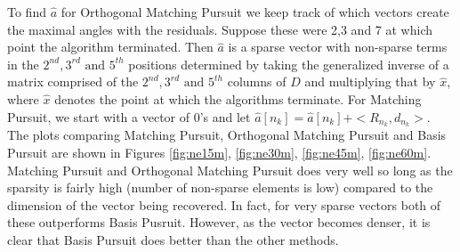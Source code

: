 \documentclass[12pt, leqno]{article}
\begin{document}
To find $\hat{a}$ for Orthogonal Matching Pursuit we keep track of
which vectors create the maximal angles with the residuals. Suppose
these were 2,3 and 7 at which point the algorithm terminated. Then
$\hat{a}$ is a sparse vector with non-sparse terms in the $2^{nd},
3^{rd} \text{ and } 5^{th}$ positions determined by taking the
generalized inverse of a matrix comprised of the  $2^{nd}, 3^{rd}
\text{ and } 5^{th}$ columns of $D$ and multiplying that by $\hat{x}$,
where $\hat{x}$ denotes the point at which the algorithms
terminate. For Matching Pursuit, we start with a vector of 0's and let
$\hat{a}[n_k] = \hat{a}[n_k]+<R_{n_k},d_{n_k}>$. The plots comparing Matching Pursuit, Orthogonal Matching Pursuit and Basis Pursuit are shown in Figures \ref{fig:ne15m}, \ref{fig:ne30m}, \ref{fig:ne45m}, \ref{fig:ne60m}. Matching Pursuit and Orthogonal Matching Pursuit does very well so long as the sparsity is fairly high (number of non-sparse elements is low) compared to the dimension of the vector being recovered. In fact, for very sparse vectors both of these outperforms Basis Pusruit. However, as the vector becomes denser, it is clear that Basis Pursuit does better than the other methods. 
\end{document}
